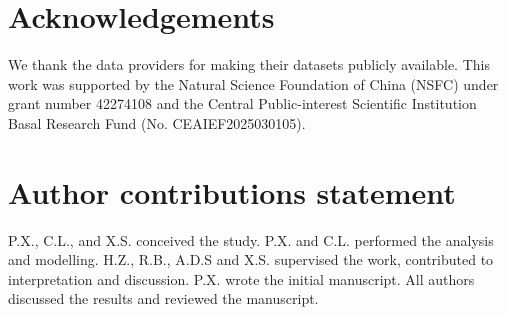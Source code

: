 \documentclass[preprint,review,12pt,authoryear]{elsarticle}
\begin{document}
\begin{table}[p]
\small
\centering
\caption{Classification criteria for different surface types}\label{tab:table2}
\end{table}

\clearpage
\nolinenumbers


\section*{Acknowledgements}
We thank the data providers for making their datasets publicly available. This work was supported by the Natural Science Foundation of China (NSFC) under grant number 42274108 and the Central Public-interest Scientific Institution Basal Research Fund (No. CEAIEF2025030105).

\section*{Author contributions statement}
P.X., C.L., and X.S. conceived the study. P.X. and C.L. performed the analysis and modelling. H.Z., R.B., A.D.S and X.S. supervised the work, contributed to interpretation and discussion. P.X. wrote the initial manuscript. All authors discussed the results and reviewed the manuscript.
\end{document}
